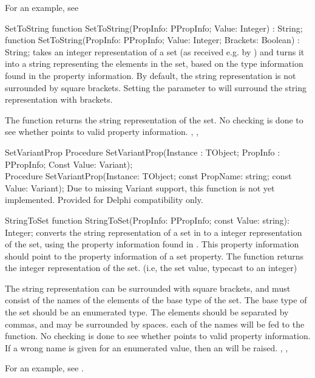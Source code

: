 For an example, see 

\begin{function}{SetToString}
\Declaration
function SetToString(PropInfo: PPropInfo; 
                     Value: Integer) : String;\\
function SetToString(PropInfo: PPropInfo; 
                     Value: Integer; Brackets: Boolean) : String;
\Description
{} takes an integer representation of a set (as received e.g.
by ) and turns it into a string representing the elements in
the set, based on the type information found in the  property
information. By default, the string representation is not surrounded by
square brackets. Setting the  parameter to  will 
surround the string representation with brackets.

The function returns the string representation of the set.
\Errors
No checking is done to see whether  points to valid property
information.
\SeeAlso
{}, , 
\end{function}


\begin{procedure}{SetVariantProp}
\Declaration
Procedure SetVariantProp(Instance : TObject;
                         PropInfo : PPropInfo;
                         Const Value: Variant);\\
Procedure SetVariantProp(Instance: TObject; 
                         const PropName: string; 
                         const Value: Variant);                 
\Description
Due to missing Variant support, this function is not yet implemented. 
Provided for Delphi compatibility only.
\Errors
\SeeAlso
\end{procedure}


\begin{function}{StringToSet}
\Declaration
function StringToSet(PropInfo: PPropInfo; const Value: string): Integer;
\Description
{} converts the string representation of a set in 
to a integer representation of the set, using the property information found
in . This property information should point to the property
information of a set property. The function returns the integer
representation of the set. (i.e, the set value, typecast to an integer)

The string representation can be surrounded with square brackets, and must 
consist of the names of the elements of the base type of the set. The base
type of the set should be an enumerated type. The elements should be
separated by commas, and may be surrounded by spaces.
each of the names will be fed to the  function.
\Errors
No checking is done to see whether  points to valid property
information. If a wrong name is given for an enumerated value, then an
 will be raised.
\SeeAlso
{}, , 
\end{function}

For an example, see .